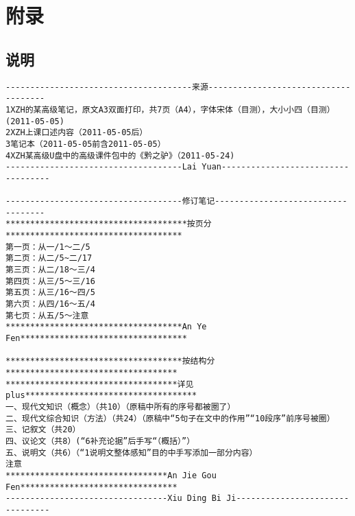 \newpage
\appendix
{}
\section{附录}
\subsection{说明}
\begin{verbatim}
--------------------------------------来源-------------------------------------
1XZH的某高级笔记，原文A3双面打印，共7页（A4），字体宋体（目测），大小小四（目测）(2011-05-05)
2XZH上课口述内容（2011-05-05后）
3笔记本（2011-05-05前含2011-05-05）
4XZH某高级U盘中的高级课件包中的《黔之驴》（2011-05-24)
------------------------------------Lai Yuan-----------------------------------

------------------------------------修订笔记-----------------------------------
*************************************按页分************************************
第一页：从一/1～二/5
第二页：从二/5~二/17
第三页：从二/18～三/4
第四页：从三/5～三/16
第五页：从三/16～四/5
第六页：从四/16～五/4
第七页：从五/5～注意
************************************An Ye Fen**********************************

************************************按结构分***********************************
***********************************详见plus***********************************
一、现代文知识（概念）（共10）（原稿中所有的序号都被圈了）
二、现代文综合知识（方法）（共24）（原稿中“5句子在文中的作用”“10段序”前序号被圈）
三、记叙文（共20）
四、议论文（共8）(“6补充论据”后手写“（概括）”）
五、说明文（共6）（“1说明文整体感知”目的中手写添加一部分内容）
注意
*********************************An Jie Gou Fen********************************
---------------------------------Xiu Ding Bi Ji--------------------------------


\end{verbatim}
